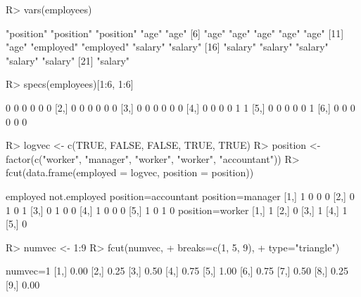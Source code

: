 \documentclass{article}\usepackage[]{graphicx}\usepackage[]{color}
\begin{document}
\begin{Schunk}
% --begin: "lcut.vars"
\begin{Sinput}
R> vars(employees)
\end{Sinput}
\begin{Soutput}
 [1] "position" "position" "position" "age"      "age"     
 [6] "age"      "age"      "age"      "age"      "age"     
[11] "age"      "employed" "employed" "salary"   "salary"  
[16] "salary"   "salary"   "salary"   "salary"   "salary"  
[21] "salary"  
\end{Soutput}
%
% --end: "lcut.vars"
\end{Schunk}

\begin{Schunk}
% --begin: "lcut.specs"
\begin{Sinput}
R> specs(employees)[1:6, 1:6]
\end{Sinput}
\begin{Soutput}
     [,1] [,2] [,3] [,4] [,5] [,6]
[1,]    0    0    0    0    0    0
[2,]    0    0    0    0    0    0
[3,]    0    0    0    0    0    0
[4,]    0    0    0    0    1    1
[5,]    0    0    0    0    0    1
[6,]    0    0    0    0    0    0
\end{Soutput}
%
% --end: "lcut.specs"
\end{Schunk}

\begin{Schunk}
% --begin: "fcut.logfact"
\begin{Sinput}
R> logvec <- c(TRUE, FALSE, FALSE, TRUE, TRUE)
R> position <- factor(c("worker", "manager", "worker", "worker", "accountant"))
R> fcut(data.frame(employed = logvec, position = position))
\end{Sinput}
\begin{Soutput}
     employed not.employed position=accountant position=manager
[1,]        1            0                   0                0
[2,]        0            1                   0                1
[3,]        0            1                   0                0
[4,]        1            0                   0                0
[5,]        1            0                   1                0
     position=worker
[1,]               1
[2,]               0
[3,]               1
[4,]               1
[5,]               0
\end{Soutput}
%
% --end: "fcut.logfact"
\end{Schunk}

\begin{Schunk}
% --begin: "fcut.numeric1"
\begin{Sinput}
R> numvec <- 1:9
R> fcut(numvec,
+       breaks=c(1, 5, 9),
+       type="triangle")
\end{Sinput}
\begin{Soutput}
      numvec=1
 [1,]     0.00
 [2,]     0.25
 [3,]     0.50
 [4,]     0.75
 [5,]     1.00
 [6,]     0.75
 [7,]     0.50
 [8,]     0.25
 [9,]     0.00
\end{Soutput}
%
% --end: "fcut.numeric1"
\end{Schunk}
\end{document}
